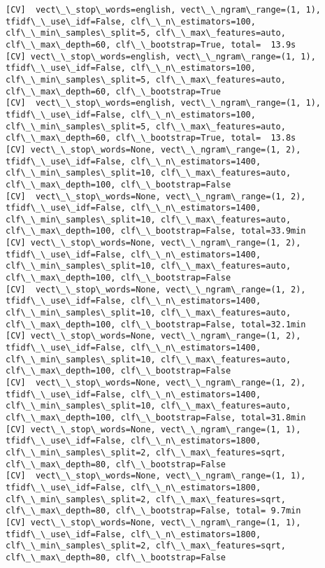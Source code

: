 \documentclass[11pt]{article}
\begin{document}
    \begin{Verbatim}[commandchars=\\\{\}]
[CV]  vect\_\_stop\_words=english, vect\_\_ngram\_range=(1, 1), tfidf\_\_use\_idf=False, clf\_\_n\_estimators=100, clf\_\_min\_samples\_split=5, clf\_\_max\_features=auto, clf\_\_max\_depth=60, clf\_\_bootstrap=True, total=  13.9s
[CV] vect\_\_stop\_words=english, vect\_\_ngram\_range=(1, 1), tfidf\_\_use\_idf=False, clf\_\_n\_estimators=100, clf\_\_min\_samples\_split=5, clf\_\_max\_features=auto, clf\_\_max\_depth=60, clf\_\_bootstrap=True 
[CV]  vect\_\_stop\_words=english, vect\_\_ngram\_range=(1, 1), tfidf\_\_use\_idf=False, clf\_\_n\_estimators=100, clf\_\_min\_samples\_split=5, clf\_\_max\_features=auto, clf\_\_max\_depth=60, clf\_\_bootstrap=True, total=  13.8s
[CV] vect\_\_stop\_words=None, vect\_\_ngram\_range=(1, 2), tfidf\_\_use\_idf=False, clf\_\_n\_estimators=1400, clf\_\_min\_samples\_split=10, clf\_\_max\_features=auto, clf\_\_max\_depth=100, clf\_\_bootstrap=False 
[CV]  vect\_\_stop\_words=None, vect\_\_ngram\_range=(1, 2), tfidf\_\_use\_idf=False, clf\_\_n\_estimators=1400, clf\_\_min\_samples\_split=10, clf\_\_max\_features=auto, clf\_\_max\_depth=100, clf\_\_bootstrap=False, total=33.9min
[CV] vect\_\_stop\_words=None, vect\_\_ngram\_range=(1, 2), tfidf\_\_use\_idf=False, clf\_\_n\_estimators=1400, clf\_\_min\_samples\_split=10, clf\_\_max\_features=auto, clf\_\_max\_depth=100, clf\_\_bootstrap=False 
[CV]  vect\_\_stop\_words=None, vect\_\_ngram\_range=(1, 2), tfidf\_\_use\_idf=False, clf\_\_n\_estimators=1400, clf\_\_min\_samples\_split=10, clf\_\_max\_features=auto, clf\_\_max\_depth=100, clf\_\_bootstrap=False, total=32.1min
[CV] vect\_\_stop\_words=None, vect\_\_ngram\_range=(1, 2), tfidf\_\_use\_idf=False, clf\_\_n\_estimators=1400, clf\_\_min\_samples\_split=10, clf\_\_max\_features=auto, clf\_\_max\_depth=100, clf\_\_bootstrap=False 
[CV]  vect\_\_stop\_words=None, vect\_\_ngram\_range=(1, 2), tfidf\_\_use\_idf=False, clf\_\_n\_estimators=1400, clf\_\_min\_samples\_split=10, clf\_\_max\_features=auto, clf\_\_max\_depth=100, clf\_\_bootstrap=False, total=31.8min
[CV] vect\_\_stop\_words=None, vect\_\_ngram\_range=(1, 1), tfidf\_\_use\_idf=False, clf\_\_n\_estimators=1800, clf\_\_min\_samples\_split=2, clf\_\_max\_features=sqrt, clf\_\_max\_depth=80, clf\_\_bootstrap=False 
[CV]  vect\_\_stop\_words=None, vect\_\_ngram\_range=(1, 1), tfidf\_\_use\_idf=False, clf\_\_n\_estimators=1800, clf\_\_min\_samples\_split=2, clf\_\_max\_features=sqrt, clf\_\_max\_depth=80, clf\_\_bootstrap=False, total= 9.7min
[CV] vect\_\_stop\_words=None, vect\_\_ngram\_range=(1, 1), tfidf\_\_use\_idf=False, clf\_\_n\_estimators=1800, clf\_\_min\_samples\_split=2, clf\_\_max\_features=sqrt, clf\_\_max\_depth=80, clf\_\_bootstrap=False 

\end{Verbatim}
\end{document}
